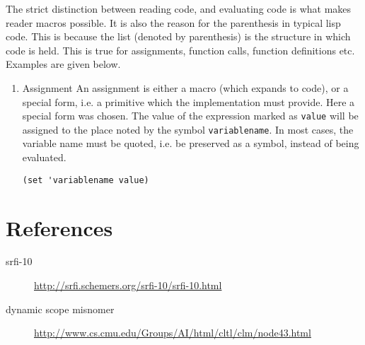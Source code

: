 \documentclass[a4paper]{article}
\begin{document}
The strict distinction between reading code, and evaluating code is what makes
reader macros possible.  It is also the reason for the parenthesis in typical
lisp code.  This is because the list (denoted by parenthesis) is the structure
in which code is held.  This is true for assignments, function calls, function
definitions etc.  Examples are given below.

\begin{enumerate}
\item Assignment
\label{sec:orgheadline14}
An assignment is either a macro (which expands to code), or a special form,
i.e. a primitive which the implementation must provide.  Here a special form was
chosen.  The value of the expression marked as \texttt{value} will be assigned
to the place noted by the symbol \texttt{variablename}.  In most cases, the
variable name must be quoted, i.e. be preserved as a symbol, instead of being
evaluated.

\begin{verbatim}
(set 'variablename value)
\end{verbatim}
\end{enumerate}

\section{References}
\label{sec:orgheadline18}
\begin{description}
\item[{srfi-10}] \url{http://srfi.schemers.org/srfi-10/srfi-10.html}
\item[{dynamic scope misnomer}] \url{http://www.cs.cmu.edu/Groups/AI/html/cltl/clm/node43.html}
\end{description}
\end{document}
